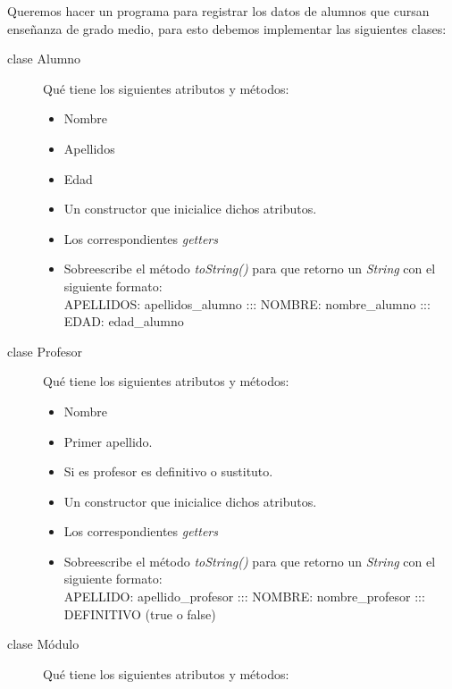 \documentclass[addpoints,12pt]{exam}
\begin{document}
\begin{center}
\end{center}
\vspace{0.1in}
\begin{questions}
\question Queremos hacer un programa para registrar los datos de alumnos que cursan enseñanza de grado medio, para esto debemos implementar las siguientes clases:
\begin{description}
\item[clase Alumno] Qué tiene los siguientes atributos y métodos:
\begin{itemize}
\item Nombre
\item Apellidos
\item Edad
\item Un constructor que inicialice dichos atributos.
\item Los correspondientes \emph{getters}
\item Sobreescribe el método \emph{toString()} para que retorno un \emph{String} con el siguiente formato:\\
APELLIDOS: apellidos\_alumno ::: NOMBRE: nombre\_alumno ::: EDAD: edad\_alumno
\end{itemize}
\item[clase Profesor] Qué tiene los siguientes atributos y métodos:
\begin{itemize}
\item Nombre
\item Primer apellido.
\item Si es profesor es definitivo o sustituto.
\item Un constructor que inicialice dichos atributos.
\item Los correspondientes \emph{getters}
\item Sobreescribe el método \emph{toString()} para que retorno un \emph{String} con el siguiente formato:\\
APELLIDO: apellido\_profesor ::: NOMBRE: nombre\_profesor ::: DEFINITIVO (true o false)
\end{itemize}
\item[clase Módulo] Qué tiene los siguientes atributos y métodos:
\begin{itemize}

\end{itemize}
\end{description}
\end{questions}
\end{document}
